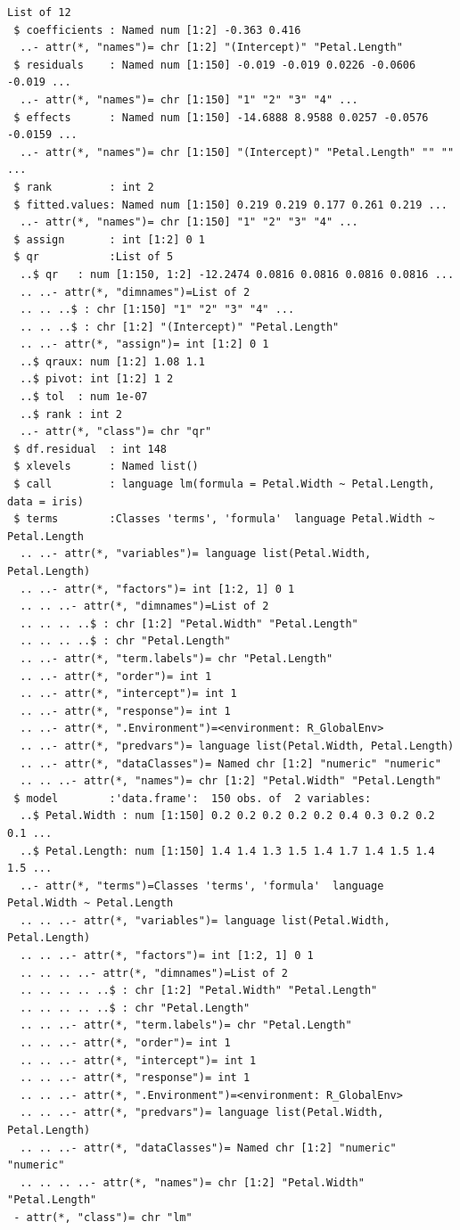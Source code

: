 \documentclass[
  letterpaper,
  DIV=11,
  numbers=noendperiod]{scrreprt}
\begin{document}
\begin{verbatim}
List of 12
 $ coefficients : Named num [1:2] -0.363 0.416
  ..- attr(*, "names")= chr [1:2] "(Intercept)" "Petal.Length"
 $ residuals    : Named num [1:150] -0.019 -0.019 0.0226 -0.0606 -0.019 ...
  ..- attr(*, "names")= chr [1:150] "1" "2" "3" "4" ...
 $ effects      : Named num [1:150] -14.6888 8.9588 0.0257 -0.0576 -0.0159 ...
  ..- attr(*, "names")= chr [1:150] "(Intercept)" "Petal.Length" "" "" ...
 $ rank         : int 2
 $ fitted.values: Named num [1:150] 0.219 0.219 0.177 0.261 0.219 ...
  ..- attr(*, "names")= chr [1:150] "1" "2" "3" "4" ...
 $ assign       : int [1:2] 0 1
 $ qr           :List of 5
  ..$ qr   : num [1:150, 1:2] -12.2474 0.0816 0.0816 0.0816 0.0816 ...
  .. ..- attr(*, "dimnames")=List of 2
  .. .. ..$ : chr [1:150] "1" "2" "3" "4" ...
  .. .. ..$ : chr [1:2] "(Intercept)" "Petal.Length"
  .. ..- attr(*, "assign")= int [1:2] 0 1
  ..$ qraux: num [1:2] 1.08 1.1
  ..$ pivot: int [1:2] 1 2
  ..$ tol  : num 1e-07
  ..$ rank : int 2
  ..- attr(*, "class")= chr "qr"
 $ df.residual  : int 148
 $ xlevels      : Named list()
 $ call         : language lm(formula = Petal.Width ~ Petal.Length, data = iris)
 $ terms        :Classes 'terms', 'formula'  language Petal.Width ~ Petal.Length
  .. ..- attr(*, "variables")= language list(Petal.Width, Petal.Length)
  .. ..- attr(*, "factors")= int [1:2, 1] 0 1
  .. .. ..- attr(*, "dimnames")=List of 2
  .. .. .. ..$ : chr [1:2] "Petal.Width" "Petal.Length"
  .. .. .. ..$ : chr "Petal.Length"
  .. ..- attr(*, "term.labels")= chr "Petal.Length"
  .. ..- attr(*, "order")= int 1
  .. ..- attr(*, "intercept")= int 1
  .. ..- attr(*, "response")= int 1
  .. ..- attr(*, ".Environment")=<environment: R_GlobalEnv> 
  .. ..- attr(*, "predvars")= language list(Petal.Width, Petal.Length)
  .. ..- attr(*, "dataClasses")= Named chr [1:2] "numeric" "numeric"
  .. .. ..- attr(*, "names")= chr [1:2] "Petal.Width" "Petal.Length"
 $ model        :'data.frame':  150 obs. of  2 variables:
  ..$ Petal.Width : num [1:150] 0.2 0.2 0.2 0.2 0.2 0.4 0.3 0.2 0.2 0.1 ...
  ..$ Petal.Length: num [1:150] 1.4 1.4 1.3 1.5 1.4 1.7 1.4 1.5 1.4 1.5 ...
  ..- attr(*, "terms")=Classes 'terms', 'formula'  language Petal.Width ~ Petal.Length
  .. .. ..- attr(*, "variables")= language list(Petal.Width, Petal.Length)
  .. .. ..- attr(*, "factors")= int [1:2, 1] 0 1
  .. .. .. ..- attr(*, "dimnames")=List of 2
  .. .. .. .. ..$ : chr [1:2] "Petal.Width" "Petal.Length"
  .. .. .. .. ..$ : chr "Petal.Length"
  .. .. ..- attr(*, "term.labels")= chr "Petal.Length"
  .. .. ..- attr(*, "order")= int 1
  .. .. ..- attr(*, "intercept")= int 1
  .. .. ..- attr(*, "response")= int 1
  .. .. ..- attr(*, ".Environment")=<environment: R_GlobalEnv> 
  .. .. ..- attr(*, "predvars")= language list(Petal.Width, Petal.Length)
  .. .. ..- attr(*, "dataClasses")= Named chr [1:2] "numeric" "numeric"
  .. .. .. ..- attr(*, "names")= chr [1:2] "Petal.Width" "Petal.Length"
 - attr(*, "class")= chr "lm"
\end{verbatim}
\end{document}
